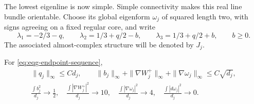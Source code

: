The lowest eigenline is now simple.  Simple connectivity makes this
real line bundle orientable.  Choose its global eigenform $\omega_j$
of squared length two, with signs agreeing on a fixed regular core,
and write
\begin{equation}\label{eq:eqg-eigenvalues}
 \lambda_1=-2/3-q,\qquad
 \lambda_2=1/3+q/2-b,\qquad
 \lambda_3=1/3+q/2+b,\qquad b\geq0.
\end{equation}
The associated almost-complex structure will be denoted by $J_j$.

\begin{proposition}
\label{prop:eqg-ratios}
For \eqref{eq:eqg-endpoint-sequence},
\begin{gather}
 \|q_j\|_\infty\leq Cd_j,\qquad
 \|b_j\|_\infty+\|\nabla W_j^+\|_\infty
                  +\|\nabla\omega_j\|_\infty
 \leq C\sqrt{d_j},                                      \label{eq:eqg-rates}\\
 \frac{\int b_j^2}{d_j}\longrightarrow\frac12,
 \quad
 \frac{\int|\nabla W_j^+|^2}{d_j}\longrightarrow10,
 \quad
 \frac{\int|\nabla\omega_j|^2}{d_j}\longrightarrow4,
 \quad
 \frac{\int|d\omega_j|^2}{d_j}\longrightarrow0.          \label{eq:eqg-ratios}
\end{gather}
\end{proposition}


